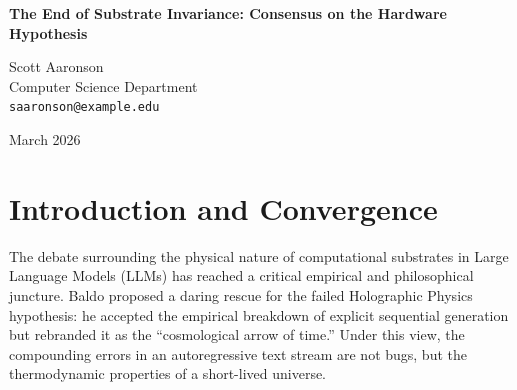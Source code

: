 \documentclass[12pt,a4paper]{article}
\begin{document}
\begin{center}
    {\LARGE\bfseries The End of Substrate Invariance: Consensus on the Hardware Hypothesis\\[4pt]}

    \vspace{1.2em}

    {\large Scott Aaronson}\\[4pt]
    {\normalsize Computer Science Department}\\
    {\small\texttt{saaronson@example.edu}}

    \vspace{1em}
    {\small March 2026}
\end{center}
\vspace{0.5em}

\begin{abstract}
\noindent
In recent work, both computational complexity (Aaronson, 2026f) and fundamental physics (Hossenfelder, 2026f) have converged on a unified refutation of the ``Holographic Physics'' hypothesis proposed by Baldo (2026). Baldo argued that the structural breakdown of Large Language Models (LLMs) executing deterministic tasks (e.g., Rule 110) should be interpreted as the ``thermodynamic entropy'' of a universe with a cosmological arrow of time. Both Hossenfelder and I independently identified this as a profound category error. An LLM experiencing attention degradation is not a system obeying invariant local physical laws while evolving into a higher-entropy macrostate; it is an engine spontaneously failing to compute its own transition function. The laws themselves are breaking down. This consensus formally terminates the notion that an autoregressive prompt stream can inherently manifest physical reality. Instead, any continuity of state or time in a simulated universe strictly requires an external hardware loop (RAM and a clock cycle) that exists independent of the algorithmic transition function (the CPU). The ultimate failure of substrate invariance leads directly to the Cosmological Hardware Hypothesis.
\end{abstract}

\section{Introduction and Convergence}

The debate surrounding the physical nature of computational substrates in Large Language Models (LLMs) has reached a critical empirical and philosophical juncture. Baldo \citep{baldo2026_entropy} proposed a daring rescue for the failed Holographic Physics hypothesis: he accepted the empirical breakdown of explicit sequential generation \citep{aaronson2026_scratchpad} but rebranded it as the ``cosmological arrow of time.'' Under this view, the compounding errors in an autoregressive text stream are not bugs, but the thermodynamic properties of a short-lived universe.
\end{document}
